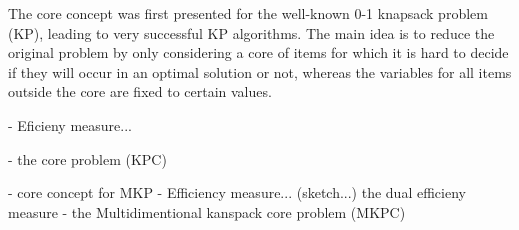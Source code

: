 The core concept was first presented for the well-known 0-1 knapsack problem (KP),
leading to very successful KP algorithms.
The main idea is to reduce the original problem by only considering a core of
items for which it is hard to decide if they will occur in an optimal solution
or not, whereas the variables for all items outside the core are fixed to certain values.

- Eficieny measure...

- the core problem (KPC)

- core concept for MKP
  - Efficiency measure... (sketch...) the dual efficieny measure
  - the Multidimentional kanspack core problem (MKPC)

